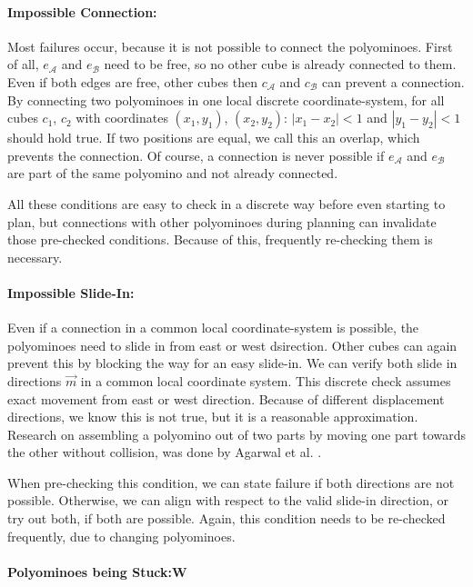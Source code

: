 \paragraph{Impossible Connection:}

Most failures occur, because it is not possible to connect the polyominoes.
First of all, $e_\mathcal{A}$ and $e_\mathcal{B}$ need to be free, so no other cube is already connected to them.
Even if both edges are free, other cubes then $c_\mathcal{A}$ and $c_\mathcal{B}$ can prevent a connection.
By connecting two polyominoes in one local discrete coordinate-system, for all cubes $c_1$, $c_2$ with coordinates $(x_1, y_1)$, $(x_2, y_2)$: $\left|x_1 - x_2\right| < 1$ and $\left|y_1 - y_2\right| < 1$ should hold true.
If two positions are equal, we call this an overlap, which prevents the connection.
Of course, a connection is never possible if $e_\mathcal{A}$ and $e_\mathcal{B}$ are part of the same polyomino and not already connected.

All these conditions are easy to check in a discrete way before even starting to plan, but connections with other polyominoes during planning can invalidate those pre-checked conditions.
Because of this, frequently re-checking them is necessary.

\paragraph{Impossible Slide-In:}

Even if a connection in a common local coordinate-system is possible, the polyominoes need to slide in from east or west dsirection.
Other cubes can again prevent this by blocking the way for an easy slide-in.
We can verify both slide in directions $\vec{m}$ in a common local coordinate system.
This discrete check assumes exact movement from east or west direction.
Because of different displacement directions, we know this is not true, but it is a reasonable approximation.
Research on assembling a polyomino out of two parts by moving one part towards the other without collision, was done by Agarwal et al. \cite{agarwal2021}. 

When pre-checking this condition, we can state failure if both directions are not possible.
Otherwise, we can align with respect to the valid slide-in direction, or try out both, if both are possible.
Again, this condition needs to be re-checked frequently, due to changing polyominoes.

\paragraph{Polyominoes being Stuck:W}

